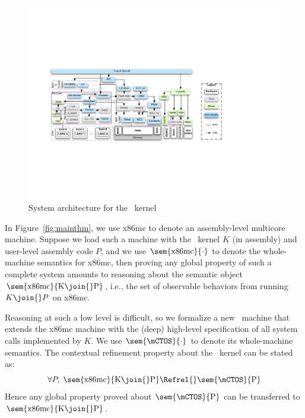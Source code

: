 {
\begin{figure}\centering
\includegraphics[scale=.75]{figs/sysarch}
\caption{System architecture for the \mCTOS\ kernel}
\label{fig:sysarch}
\vspace*{-10pt}
\end{figure}
}

In Figure~\ref{fig:mainthm}, we use x86mc to denote an assembly-level
multicore machine.  Suppose we load such a machine with the
\mCTOS\ kernel $K$ (in assembly) and user-level assembly code $P$, and
we use {$\sem{\rm{}x86mc}{\cdot}$} to denote the whole-machine
semantics for x86mc, then proving any global property of such a
complete system amounts to reasoning about the semantic object
{$\sem{\rm{}x86mc}{K\join{}P}$}, i.e., the set of observable behaviors
from running $K\join{}P$ on x86mc.

Reasoning at such a low level is difficult, so we formalize a new
\mCTOS\ machine that extends the x86mc machine with the (deep) high-level
specification of all system calls implemented by $K$.
We use $\sem{\rm\mCTOS}{\cdot}$ to denote its
whole-machine semantics.  The contextual refinement property about the
\mCTOS\ kernel can be stated as:
 \[
\forall{}P,\;\sem{\rm{}x86mc}{K\join{}P}\Refrel{}\sem{\rm\mCTOS}{P}
\]%
\noindent
Hence any global property proved about
$\sem{\rm\mCTOS}{P}$ can be transferred to
$\sem{\rm{}x86mc}{K\join{}P}$.

